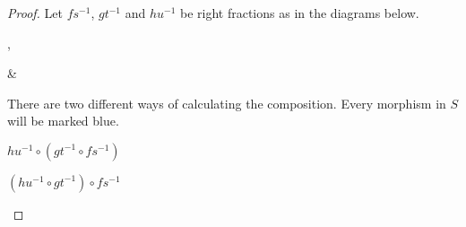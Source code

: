     \begin{proof}
         Let $fs^{-1}$, $gt^{-1}$ and $hu^{-1}$ be right fractions as in the diagrams below.
        \begin{center}
            ,
            \&
        \end{center}
        There are two different ways of calculating the composition. Every morphism in $S$ will be marked blue.
        \begin{center}
            \begin{minipage}[c]{0.4\textwidth}
                \underline{$hu^{-1}\circ (gt^{-1}\circ fs^{-1})$}\\
            \end{minipage}
            \begin{minipage}[c]{0.4\textwidth}
                \underline{$(hu^{-1}\circ gt^{-1})\circ fs^{-1}$}\\
            \end{minipage}

\end{center}
\end{proof}
